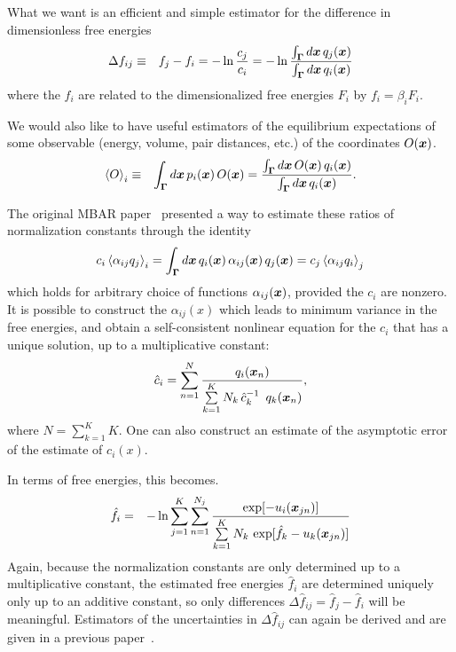 \documentclass[aps,pre,twocolumn,superscriptaddress]{revtex4-1}
\newcommand{\bfv}[1]{{\mbox{\boldmath{$#1$}}}}
\newcommand{\bfm}[1]{{\bf #1}}
\newcommand{\expect}[1]{\left \langle #1 \right \rangle} %
\newcommand{\x}{\bfv{x}}
\begin{document}
What we want is an efficient and simple estimator for the difference
in dimensionless free energies
\begin{eqnarray}
\Delta f_{ij} &\equiv& f_j - f_i = - \ln \frac{c_j}{c_i} = - \ln \frac{\int_\bfm{\Gamma} d\x \, q_j(\x)}{\int_\bfm{\Gamma} d\x \, q_i(\x)} \label{equation:dimensionless-free-energy}
\end{eqnarray}
where the $f_i$ are related to the dimensionalized free energies $F_i$ by $f_i = \beta_i F_i$.  

We would also like to have useful estimators of the equilibrium
expectations of some observable (energy, volume, pair distances, etc.)
of the coordinates $O(\x)$.
\begin{eqnarray}
\expect{O}_i &\equiv& \int_{\bfm{\Gamma}} d\x \, p_i(\x) \, O(\x) = \frac{\int_\bfm{\Gamma} d\x \, O(\x) \, q_i(\x)}{\int_\bfm{\Gamma} d\x \, q_i(\x)} .\label{equation:equilibrium-expectation}
\end{eqnarray}

The original MBAR paper~\cite{shirts-chodera:jcp:2008:mbar} presented
a way to estimate these ratios of normalization constants through the
identity
\begin{eqnarray}
c_i \expect{\alpha_{ij} q_j}_i = \int_{\bfm{\Gamma}} d\x \, q_i(\x) \, \alpha_{ij}(\x) \, q_j(\x)  =  c_j \expect{\alpha_{ij} q_i}_j
\label{equation:Bennett_starting}
\end{eqnarray}
which holds for arbitrary choice of functions $\alpha_{ij}(\x)$,
provided the $c_i$ are nonzero.  It is possible to construct the
$\alpha_{ij}(x)$ which leads to minimum variance in the free energies,
and obtain a self-consistent nonlinear equation for the $c_i$ that has
a unique solution, up to a multiplicative constant:
\begin{eqnarray}
\hat{c}_i = \sum_{n=1}^N \frac{ q_i(\x_n)}{\sum\limits_{k=1}^K N_k \, \hat{c}_k^{-1} \,\ q_k(\x_n)},
\end{eqnarray}
where $N = \sum_{k=1}^K K$. One can also construct an estimate of the
asymptotic error of the estimate of $c_i(x)$.~\citep{shirts-chodera:jcp:2008:mbar}

In terms of free energies, this becomes.
\begin{eqnarray}
\hat f_i &=& - \ln \sum_{j=1}^K \sum_{n=1}^{N_j} \frac{\exp[-u_i(\x_{jn})]}{\sum\limits_{k=1}^K N_k \, \exp[\hat{f}_k - u_k(\x_{jn})]} \label{equation:estimator-of-free-energies}
\end{eqnarray}
Again, because the normalization constants are only determined up to a
multiplicative constant, the estimated free energies $\hat{f}_i$ are
determined uniquely only up to an additive constant, so only
differences $\Delta \hat{f}_{ij} = \hat{f}_j - \hat{f}_i$ will be
meaningful.  Estimators of the uncertainties in $\Delta \hat{f}_{ij}$
can again be derived and are given in a previous
paper~\cite{shirts-chodera:jcp:2008:mbar}. 
\end{document}
